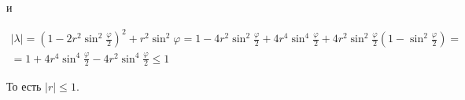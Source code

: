 \documentclass[14pt,a4paper]{scrartcl}
\begin{document}
и

\begin{equation*}
	\begin{array}{l}
	|\lambda|=\left(1-2 r^{2} \sin ^{2} \frac{\varphi}{2}\right)^{2}+r^{2} \sin ^{2} \varphi=1-4 r^{2} \sin ^{2} \frac{\varphi}{2}+4 r^{4} \sin ^{4} \frac{\varphi}{2}+4 r^{2} \sin ^{2} \frac{\varphi}{2}\left(1-\sin ^{2} \frac{\varphi}{2}\right)= \\
	=1+4 r^{4} \sin ^{4} \frac{\varphi}{2}-4 r^{2} \sin ^{4} \frac{\varphi}{2} \leq 1
	\end{array}
\end{equation*}

То есть $|r| \leq 1$.






















	
	
\end{document}
